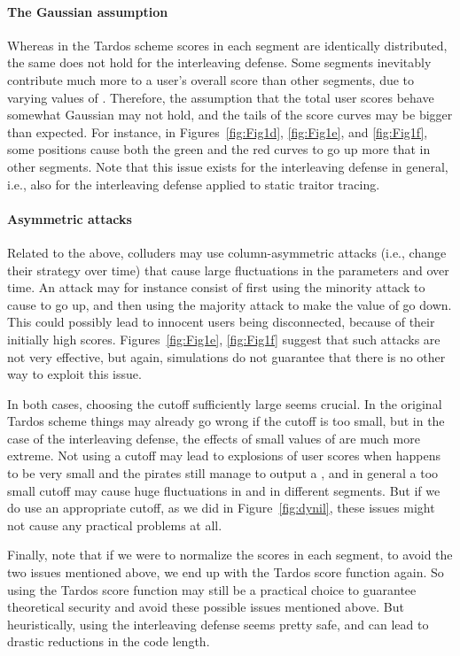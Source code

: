 \documentclass[10pt,a4paper,twocolumn]{article}
\begin{document}
\paragraph{The Gaussian assumption} 
Whereas in the Tardos scheme scores in each segment are identically distributed, the same does not hold for the interleaving defense. Some segments inevitably contribute much more to a user's overall score than other segments, due to varying values of . Therefore, the assumption that the total user scores behave somewhat Gaussian may not hold, and the tails of the score curves may be bigger than expected. For instance, in Figures~\ref{fig:Fig1d}, \ref{fig:Fig1e}, and \ref{fig:Fig1f}, some positions cause both the green and the red curves to go up more that in other segments. Note that this issue exists for the interleaving defense in general, i.e., also for the interleaving defense applied to static traitor tracing.

\paragraph{Asymmetric attacks}
Related to the above, colluders may use column-asymmetric attacks (i.e., change their strategy over time) that cause large fluctuations in the parameters  and  over time. An attack may for instance consist of first using the minority attack to cause  to go up, and then using the majority attack to make the value of  go down. This could possibly lead to innocent users being disconnected, because of their initially high scores. Figures~\ref{fig:Fig1e}, \ref{fig:Fig1f} suggest that such attacks are not very effective, but again, simulations do not guarantee that there is no other way to exploit this issue.

In both cases, choosing the cutoff  sufficiently large seems crucial. In the original Tardos scheme things may already go wrong if the cutoff is too small, but in the case of the interleaving defense, the effects of small values of  are much more extreme. Not using a cutoff may lead to explosions of user scores when  happens to be very small and the pirates still manage to output a , and in general a too small cutoff may cause huge fluctuations in  and  in different segments. But if we do use an appropriate cutoff, as we did in Figure~\ref{fig:dynil}, these issues might not cause any practical problems at all.

Finally, note that if we were to normalize the scores in each segment, to avoid the two issues mentioned above, we end up with the Tardos score function again. So using the Tardos score function may still be a practical choice to guarantee theoretical security and avoid these possible issues mentioned above. But heuristically, using the interleaving defense seems pretty safe, and can lead to drastic reductions in the code length.
\end{document}
